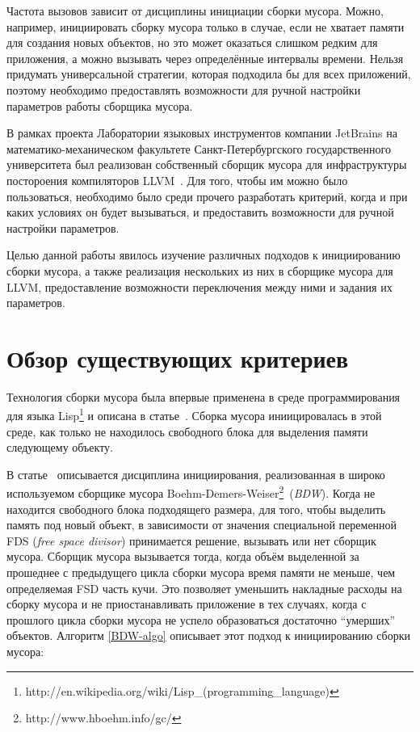 \documentclass[14pt]{extarticle}
\begin{document}
Частота вызовов
зависит от дисциплины инициации сборки мусора. Можно, например, инициировать сборку
мусора только в случае, если не хватает памяти для создания новых объектов, но это может 
оказаться слишком редким для приложения, а можно вызывать через определённые интервалы времени.
Нельзя придумать универсальной стратегии, которая подходила бы для всех приложений, поэтому
необходимо
предоставлять возможности для ручной настройки параметров работы сборщика мусора. 

В рамках проекта Лаборатории языковых инструментов компании JetBrains на математико-механическом 
факультете
Санкт-Петербургского государственного университета был реализован собственный сборщик
мусора для
инфраструктуры постороения компиляторов LLVM~\cite{llvm-text}. Для того, чтобы им можно
было пользоваться,
необходимо было среди прочего разработать критерий, когда и при каких условиях он будет 
вызываться, и предоставить возможности для ручной настройки параметров.

Целью данной работы явилось изучение различных подходов к инициированию сборки мусора,
а также реализация нескольких из них в сборщике мусора для LLVM, предоставление 
возможности переключения между ними и задания их параметров.

\pagebreak
\section {Обзор существующих критериев}

Технология сборки мусора была впервые применена в среде программирования для языка
Lisp\footnote{http://en.wikipedia.org/wiki/Lisp\_(programming\_language)} и описана 
в статье~\cite{Lisp}. Сборка мусора иниицировалась в этой среде, как только не находилось
свободного блока для выделения памяти следующему объекту. 



В статье~\cite{BDW} описывается дисциплина инициирования, реализованная в
широко используемом сборщике мусора
Boehm-Demers-Weiser\footnote{http://www.hboehm.info/gc/}~(\textit{BDW}). 
Когда не находится свободного блока подходящего размера, для того, чтобы выделить память 
под новый объект,
в зависимости от значения специальной переменной FDS (\textit{free space divisor}) 
принимается решение,
вызывать или нет сборщик мусора. Сборщик мусора вызывается тогда, когда объём выделенной за прошеднее с предыдущего цикла сборки мусора
время памяти не меньше, чем определяемая FSD часть кучи. Это позволяет  уменьшить накладные расходы на сборку мусора и не приостанавливать
приложение в тех случаях, когда с прошлого цикла сборки мусора не успело образоваться
достаточно ``умерших'' объектов. Алгоритм \ref{BDW-algo} описывает этот подход к инициированию сборки мусора: 
\end{document}
